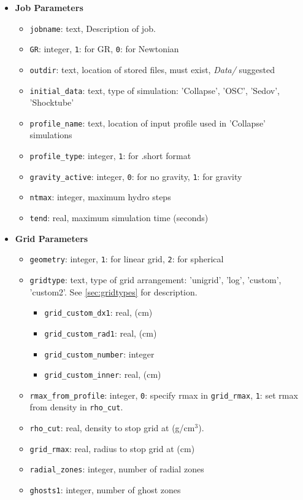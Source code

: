 \documentclass[10pt,nofootinbib]{article}
\newcommand{\code}[1]{\texttt{#1}}
\begin{document}
\begin{itemize}
\item{{\bf Job Parameters}}
\begin{itemize}
\item{{\tt jobname}: text, Description of job.}
\item{{\tt GR}: integer, \code{1}: for GR, \code{0}: for Newtonian}
\item{{\tt outdir}: text, location of stored files, must exist, {\it
    Data/} suggested}
\item{{\tt initial\_data}: text, type of simulation: 'Collapse',
  'OSC', 'Sedov', 'Shocktube'}
\item{{\tt profile\_name}: text, location of input profile used in 'Collapse' simulations}
\item{{\tt profile\_type}: integer, \code{1}: for .short format}
\item{{\tt gravity\_active}: integer, \code{0}: for no gravity, \code{1}: for gravity}
\item{{\tt ntmax}: integer, maximum hydro steps}
\item{{\tt tend}: real, maximum simulation time (seconds)}
\end{itemize}
\item{{\bf Grid Parameters}}
\begin{itemize}
\item{{\tt geometry}: integer, \code{1}: for linear grid, \code{2}: for spherical}
\item{{\tt gridtype}: text, type of grid arrangement: 'unigrid', 'log', 'custom', 'custom2'.  See \ref{sec:gridtypes} for description}.
\begin{itemize}
\item{{\tt grid\_custom\_dx1}: real, (cm)}
\item{{\tt grid\_custom\_rad1}: real, (cm)}
\item{{\tt grid\_custom\_number}: integer}
\item{{\tt grid\_custom\_inner}: real, (cm)}
\end{itemize}
\item{{\tt rmax\_from\_profile}: integer, \code{0}: specify rmax in {\tt grid\_rmax}, \code{1}: set rmax from density in {\tt rho\_cut}}.
\item{{\tt rho\_cut}: real, density to stop grid at (g/cm$^3$)}.
\item{{\tt grid\_rmax}: real, radius to stop grid at (cm)}
\item{{\tt radial\_zones}: integer, number of radial zones}
\item{{\tt ghosts1}: integer, number of ghost zones}

\end{itemize}
\end{itemize}
\end{document}
